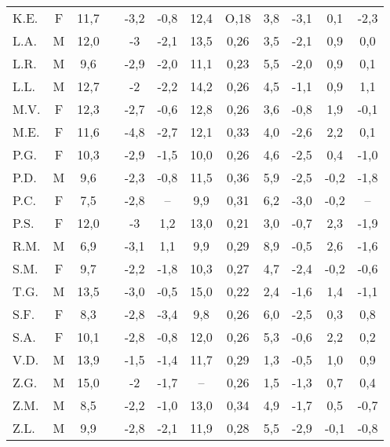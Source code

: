\begin{sidewaystable}
\begin{tabular}{lccccccccccc}
K.E. & F & 11,7   &  		& -3,2 & -0,8 & 12,4   & O,18 & 3,8 & -3,1 & 0,1  &-2,3                                \\
L.A. & M & 12,0 & \checkmark 	&  -3  & -2,1 & 13,5 & 0,26 & 3,5 & -2,1 & 0,9  & 0,0                     \\
L.R. & M & 9,6  &  		& -2,9 & -2,0 & 11,1 & 0,23 & 5,5 & -2,0 & 0,9  & 0,1                            \\
L.L. & M & 12,7 &  		&  -2  & -2,2 & 14,2 & 0,26 & 4,5 & -1,1 & 0,9  & 1,1                            \\
M.V. & F & 12,3 & \checkmark 	& -2,7 & -0,6 & 12,8 & 0,26 & 3,6 & -0,8 & 1,9  & -0,1                    \\
M.E. & F & 11,6 &  		& -4,8 & -2,7 & 12,1 & 0,33 & 4,0 & -2,6 & 2,2  & 0,1                            \\
P.G. & F & 10,3 & \checkmark 	& -2,9 & -1,5 & 10,0 & 0,26 & 4,6 & -2,5 & 0,4  & -1,0                    \\
P.D. & M & 9,6  &  		& -2,3 & -0,8 & 11,5 & 0,36 & 5,9 & -2,5 & -0,2 & -1,8                           \\
P.C. & F & 7,5  &  		& -2,8 & --   & 9,9  & 0,31 & 6,2 & -3,0 & -0,2 & --                           \\
P.S. & F & 12,0 &  		&  -3  & 1,2  & 13,0 & 0,21 & 3,0 & -0,7 & 2,3  & -1,9                           \\
R.M. & M & 6,9  & \checkmark 	& -3,1 & 1,1  & 9,9  & 0,29 & 8,9 & -0,5 & 2,6  & -1,6                    \\
S.M. & F & 9,7  & \checkmark 	& -2,2 & -1,8 & 10,3 & 0,27 & 4,7 & -2,4 & -0,2 & -0,6                    \\
T.G. & M & 13,5   &             & -3,0 & -0,5 & 15,0 & 0,22 & 2,4 & -1,6 & 1,4 & -1,1     \\
S.F. & F & 8,3  &  		& -2,8 & -3,4 & 9,8  & 0,26 & 6,0 & -2,5 & 0,3  & 0,8                            \\
S.A. & F & 10,1 &  		& -2,8 & -0,8 & 12,0 & 0,26 & 5,3 & -0,6 & 2,2  & 0,2                            \\
V.D. & M & 13,9 &  		& -1,5 & -1,4 & 11,7 & 0,29 & 1,3 & -0,5 & 1,0  & 0,9                            \\
Z.G. & M & 15,0 &  		&  -2  & -1,7 &   --   & 0,26 & 1,5 & -1,3 & 0,7  & 0,4                            \\
Z.M. & M & 8,5  &  		& -2,2 & -1,0 & 13,0 & 0,34 & 4,9 & -1,7 & 0,5  & -0,7                           \\
Z.L. & M & 9,9  &  		& -2,8 & -2,1 & 11,9 & 0,28 & 5,5 & -2,9 & -0,1 & -0,8                           \\

\bottomrule
\end{tabular}
\end{sidewaystable}